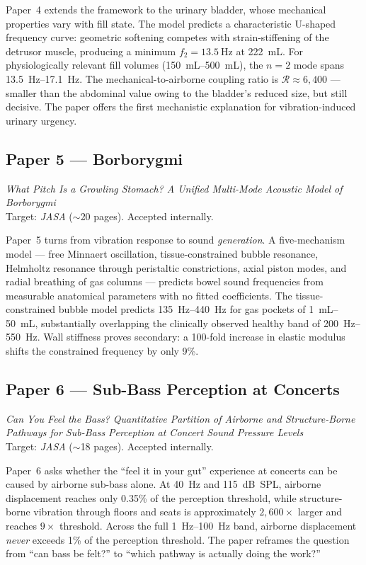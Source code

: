 \documentclass[11pt,a4paper]{article}
\begin{document}
Paper~4 extends the framework to the urinary bladder, whose mechanical properties vary with fill state. The model predicts a characteristic U-shaped frequency curve: geometric softening competes with strain-stiffening of the detrusor muscle, producing a minimum $f_2 = \SI{13.5}{\Hz}$ at \SI{222}{\mL}. For physiologically relevant fill volumes (\SIrange{150}{500}{\mL}), the $n = 2$ mode spans \SIrange{13.5}{17.1}{\Hz}. The mechanical-to-airborne coupling ratio is $\mathcal{R} \approx 6{,}400$ --- smaller than the abdominal value owing to the bladder's reduced size, but still decisive. The paper offers the first mechanistic explanation for vibration-induced urinary urgency.

\subsection{Paper 5 --- Borborygmi}

\emph{What Pitch Is a Growling Stomach? A Unified Multi-Mode Acoustic Model of Borborygmi}\\
Target: \emph{JASA} ($\sim$20 pages). Accepted internally.

Paper~5 turns from vibration response to sound \emph{generation}. A five-mechanism model --- free Minnaert oscillation, tissue-constrained bubble resonance, Helmholtz resonance through peristaltic constrictions, axial piston modes, and radial breathing of gas columns --- predicts bowel sound frequencies from measurable anatomical parameters with no fitted coefficients. The tissue-constrained bubble model predicts \SIrange{135}{440}{\Hz} for gas pockets of \SIrange{1}{50}{\mL}, substantially overlapping the clinically observed healthy band of \SIrange{200}{550}{\Hz}. Wall stiffness proves secondary: a 100-fold increase in elastic modulus shifts the constrained frequency by only 9\%.

\subsection{Paper 6 --- Sub-Bass Perception at Concerts}

\emph{Can You Feel the Bass? Quantitative Partition of Airborne and Structure-Borne Pathways for Sub-Bass Perception at Concert Sound Pressure Levels}\\
Target: \emph{JASA} ($\sim$18 pages). Accepted internally.

Paper~6 asks whether the ``feel it in your gut'' experience at concerts can be caused by airborne sub-bass alone. At \SI{40}{\Hz} and \SI{115}{\dB}~SPL, airborne displacement reaches only 0.35\% of the perception threshold, while structure-borne vibration through floors and seats is approximately $2{,}600\times$ larger and reaches $9\times$ threshold. Across the full \SIrange{1}{100}{\Hz} band, airborne displacement \emph{never} exceeds 1\% of the perception threshold. The paper reframes the question from ``can bass be felt?'' to ``which pathway is actually doing the work?''
\end{document}
